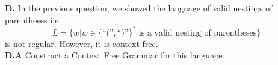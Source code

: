 \documentclass[10pt]{article}
\begin{document}







\newpage

\noindent
\textbf{D.} In the previous question, we showed the language of valid nestings of parentheses i.e. $$L=\{w|w\in\{\text{``(''}, \text{``)''}\}^* \text{ is a valid nesting of parentheses}\}$$ is not regular. However, it is context free.\\
\textbf{D.A} Construct a Context Free Grammar for this language.
\end{document}

